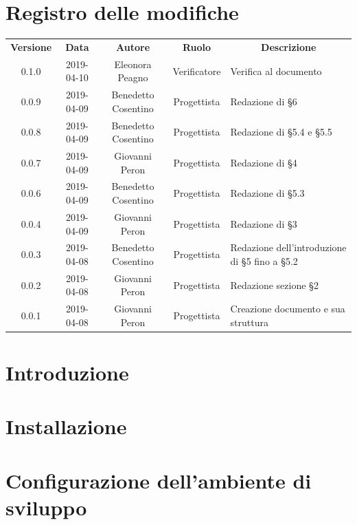 \documentclass[11pt,a4paper]{article}
\begin{document}
	
	{\def\arraystretch{2}\tabcolsep=10pt
	\newpage
	\section*{\centering Registro delle modifiche}
	\begin{tabularx}{\textwidth}{ c | c | c | c | X }
		\rowcolor{LightBlue}
		\color{white}\bfseries Versione & \color{white}\bfseries Data & \color{white}\bfseries Autore & \color{white}\bfseries Ruolo & \multicolumn{1}{c}{\color{white}\bfseries Descrizione}\\[0.25cm]
		0.1.0 & 2019-04-10 & Eleonora Peagno & Verificatore & Verifica al documento \\ \hline
		0.0.9 & 2019-04-09 & Benedetto Cosentino & Progettista & Redazione di \S6 \\ \hline 
		0.0.8 & 2019-04-09 & Benedetto Cosentino & Progettista & Redazione di \S5.4 e \S5.5 \\ \hline 
		0.0.7 & 2019-04-09 & Giovanni Peron & Progettista & Redazione di \S4 \\ \hline 
		0.0.6 & 2019-04-09 & Benedetto Cosentino & Progettista & Redazione di \S5.3 \\ \hline
		0.0.4 & 2019-04-09 & Giovanni Peron & Progettista & Redazione di \S3 \\ \hline		
		0.0.3 & 2019-04-08 & Benedetto Cosentino & Progettista & Redazione dell'introduzione di \S5 fino a \S5.2 \\ \hline
		0.0.2 & 2019-04-08 & Giovanni Peron & Progettista & Redazione sezione \S2 \\ \hline
		0.0.1 & 2019-04-08 & Giovanni Peron & Progettista & Creazione documento e sua struttura\\ \hline
		
	\end{tabularx}
	\newpage
	\tableofcontents
	\newpage
	\listoffigures
	\lstlistoflistings
	\newpage	

	\section{Introduzione}
	
	\newpage	

	\section{Installazione}
	
	\newpage

	\section{Configurazione dell'ambiente di sviluppo}
	
	\newpage

}
\end{document}

